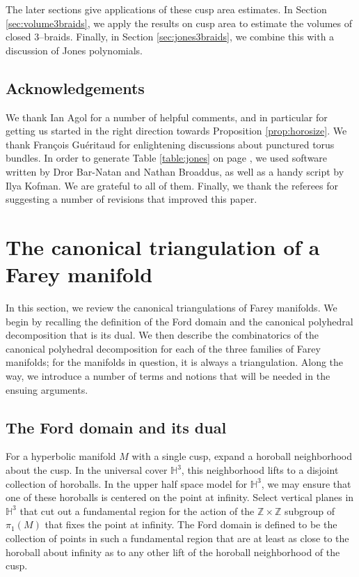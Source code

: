 \documentclass[11pt]{amsart}
\newcommand{\HH}{{\mathbb{H}}}
\newcommand{\ZZ}{{\mathbb{Z}}}
\theoremstyle{plain}
\theoremstyle{definition}
\begin{document}
The later sections give applications of these cusp area estimates.  In
Section \ref{sec:volume3braids}, we apply the results on cusp area to
estimate the volumes of closed 3--braids.  Finally, in Section
\ref{sec:jones3braids}, we combine this with a discussion of Jones
polynomials.

\subsection{Acknowledgements}

We thank Ian Agol for a number of helpful comments, and in particular
for getting us started in the right direction towards Proposition
\ref{prop:horosize}.  We thank Fran\c{c}ois Gu\'eritaud for
enlightening discussions about punctured torus bundles.  In order to generate 
Table \ref{table:jones} on page \pageref{table:jones},
we used 
software written by Dror Bar-Natan and Nathan Broaddus, 
as well as a handy script by Ilya Kofman. 
 We are grateful to all of them. 
Finally, we thank 
the referees for suggesting a number of revisions that improved 
this paper.




\section{The canonical triangulation of a Farey manifold}\label{sec:farey-ford}

In this section, we review the canonical triangulations of Farey
manifolds. We begin by recalling the definition of the Ford domain and
the canonical polyhedral decomposition that is its dual. We then
describe the combinatorics of the canonical polyhedral decomposition for
each of the three families of Farey manifolds; for the manifolds in
question, it is always a triangulation. Along the way, we introduce a
number of terms and notions that will be needed in the ensuing
arguments.

\subsection{The Ford domain and its dual}\label{sec:ford-rev}

For a hyperbolic manifold $M$ with a single cusp, expand a horoball
neighborhood about the cusp.  In the universal cover $\HH^3$, this
neighborhood lifts to a disjoint collection of horoballs.  In the
upper half space model for $\HH^3$, we may ensure that one of these
horoballs is centered on the point at infinity.  Select vertical
planes in $\HH^3$ that cut out a fundamental region for the action of
the $\ZZ \times \ZZ$ subgroup of $\pi_1(M)$ that fixes the point at
infinity.  The Ford domain is defined to be the collection of points
in such a fundamental region that are at least as close to the
horoball about infinity as to any other lift of the horoball
neighborhood of the cusp.
\end{document}
